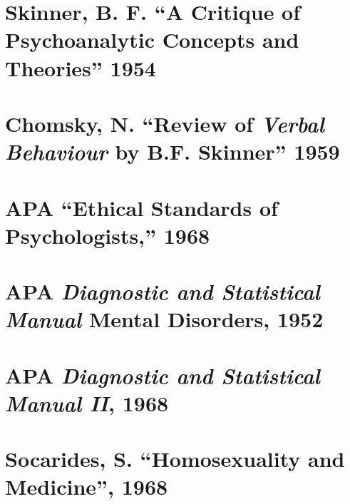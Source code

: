 \begin{appendices}
\label{app: Freud}


\chapter{Skinner, B. F. ``A Critique of Psychoanalytic Concepts and Theories'' 1954}
\label{skinnerb.f.acritiqueofpsychoanalyticconceptsandtheories1954}

\label{app: Skinner}


\chapter{Chomsky, N. ``Review of \emph{Verbal Behaviour} by B.F. Skinner'' 1959}
\label{chomskyn.reviewofverbalbehaviourbyb.f.skinner1959}

\label{app: Chomsky}


\chapter{APA ``Ethical Standards of Psychologists,'' 1968}
\label{apaethicalstandardsofpsychologists1968}

\label{app: APAEthics}


\chapter{APA \emph{Diagnostic and Statistical Manual} Mental Disorders, 1952}
\label{apadiagnosticandstatisticalmanualmentaldisorders1952}

\label{app: DSMI}


\chapter{APA \emph{Diagnostic and Statistical Manual II}, 1968}
\label{apadiagnosticandstatisticalmanualii1968}

\label{app: DSMII}


\chapter{Socarides, S. ``Homosexuality and Medicine'', 1968}
\label{socaridess.homosexualityandmedicine1968}

\label{app: DSMII}


\end{appendices}

